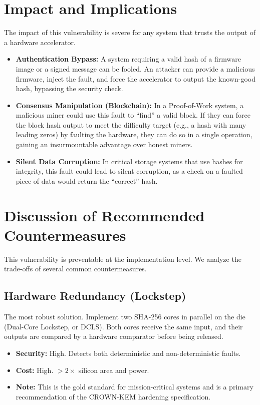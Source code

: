 \documentclass[11pt, a4paper]{article}
\begin{document}
\section{Impact and Implications}
The impact of this vulnerability is severe for any system that trusts the output of a hardware accelerator.
\begin{itemize}
    \item \textbf{Authentication Bypass:} A system requiring a valid hash of a firmware image or a signed message can be fooled. An attacker can provide a malicious firmware, inject the fault, and force the accelerator to output the known-good hash, bypassing the security check.
    \item \textbf{Consensus Manipulation (Blockchain):} In a Proof-of-Work system, a malicious miner could use this fault to ``find'' a valid block. If they can force the block hash output to meet the difficulty target (e.g., a hash with many leading zeros) by faulting the hardware, they can do so in a single operation, gaining an insurmountable advantage over honest miners.
    \item \textbf{Silent Data Corruption:} In critical storage systems that use hashes for integrity, this fault could lead to silent corruption, as a check on a faulted piece of data would return the ``correct'' hash.
\end{itemize}

\section{Discussion of Recommended Countermeasures}
This vulnerability is preventable at the implementation level. We analyze the trade-offs of several common countermeasures.

\subsection{Hardware Redundancy (Lockstep)}
The most robust solution. Implement two SHA-256 cores in parallel on the die (Dual-Core Lockstep, or DCLS). Both cores receive the same input, and their outputs are compared by a hardware comparator before being released.
\begin{itemize}
    \item \textbf{Security:} High. Detects both deterministic and non-deterministic faults.
    \item \textbf{Cost:} High. $>2\times$ silicon area and power.
    \item \textbf{Note:} This is the gold standard for mission-critical systems and is a primary recommendation of the CROWN-KEM hardening specification.
\end{itemize}
\end{document}
